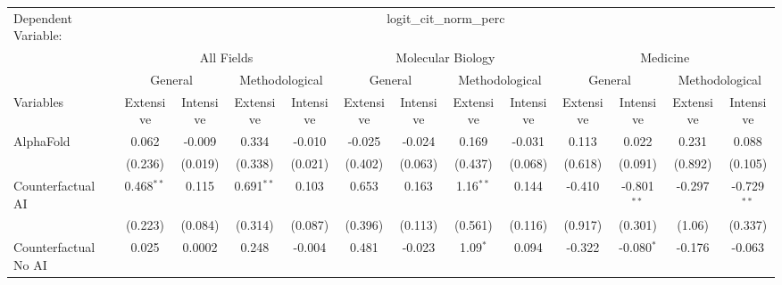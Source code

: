 \begingroup
\centering
\begin{tabular}{lcccccccccccc}
   \tabularnewline \midrule \midrule
   Dependent Variable: & \multicolumn{12}{c}{logit\_cit\_norm\_perc}\\
 & \multicolumn{4}{c}{All Fields} & \multicolumn{4}{c}{Molecular Biology} & \multicolumn{4}{c}{Medicine} \\
\cmidrule(lr){2-5} \cmidrule(lr){6-9} \cmidrule(lr){10-13}
 & \multicolumn{2}{c}{General} & \multicolumn{2}{c}{Methodological} & \multicolumn{2}{c}{General} & \multicolumn{2}{c}{Methodological} & \multicolumn{2}{c}{General} & \multicolumn{2}{c}{Methodological} \\
\cmidrule(lr){2-3} \cmidrule(lr){4-5} \cmidrule(lr){6-7} \cmidrule(lr){8-9} \cmidrule(lr){10-11} \cmidrule(lr){12-13}
Variables & \multicolumn{1}{c}{Extensive} & \multicolumn{1}{c}{Intensive} & \multicolumn{1}{c}{Extensive} & \multicolumn{1}{c}{Intensive} & \multicolumn{1}{c}{Extensive} & \multicolumn{1}{c}{Intensive} & \multicolumn{1}{c}{Extensive} & \multicolumn{1}{c}{Intensive} & \multicolumn{1}{c}{Extensive} & \multicolumn{1}{c}{Intensive} & \multicolumn{1}{c}{Extensive} & \multicolumn{1}{c}{Intensive} \\
\cmidrule(lr){1-1}\cmidrule(lr){2-2} \cmidrule(lr){3-3} \cmidrule(lr){4-4} \cmidrule(lr){5-5} \cmidrule(lr){6-6} \cmidrule(lr){7-7} \cmidrule(lr){8-8} \cmidrule(lr){9-9} \cmidrule(lr){10-10} \cmidrule(lr){11-11} \cmidrule(lr){12-12} \cmidrule(lr){13-13}
   AlphaFold                                & 0.062        & -0.009         & 0.334        & -0.010         & -0.025  & -0.024       & 0.169       & -0.031  & 0.113   & 0.022         & 0.231   & 0.088\\   
                                            & (0.236)      & (0.019)        & (0.338)      & (0.021)        & (0.402) & (0.063)      & (0.437)     & (0.068) & (0.618) & (0.091)       & (0.892) & (0.105)\\   
   Counterfactual AI                        & 0.468$^{**}$ & 0.115          & 0.691$^{**}$ & 0.103          & 0.653   & 0.163        & 1.16$^{**}$ & 0.144   & -0.410  & -0.801$^{**}$ & -0.297  & -0.729$^{**}$\\   
                                            & (0.223)      & (0.084)        & (0.314)      & (0.087)        & (0.396) & (0.113)      & (0.561)     & (0.116) & (0.917) & (0.301)       & (1.06)  & (0.337)\\   
   Counterfactual No AI                     & 0.025        & 0.0002         & 0.248        & -0.004         & 0.481   & -0.023       & 1.09$^{*}$  & 0.094   & -0.322  & -0.080$^{*}$  & -0.176  & -0.063\\   

\end{tabular}
